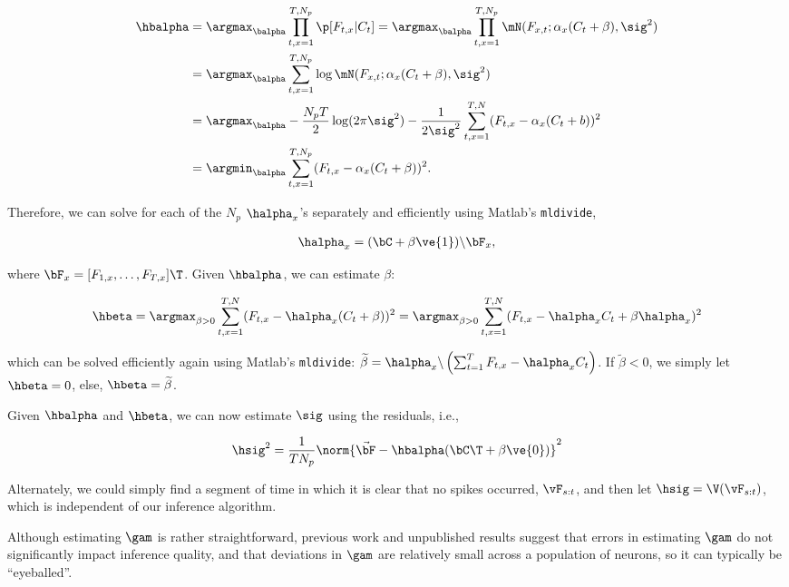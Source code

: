 \begin{subequations}
\begin{align}
\hbalpha 
&= \argmax_{\balpha} \prod_{t,x=1}^{T,N_p}  \p[F_{t,x} | C_t] 
=  \argmax_{\balpha} \prod_{t,x=1}^{T,N_p} \mN(F_{x,t}; \alpha_x ( C_t + \beta), \sig^2) \\
&= \argmax_{\balpha} \sum_{t,x=1}^{T,N_p} \log \mN (F_{x,t}; \alpha_x ( C_t + \beta), \sig^2)  \\
&= \argmax_{\balpha}  -\frac{N_p T}{2}\log(2\pi \sig^2) -\frac{1}{2\sig^2}\sum_{t,x=1}^{T,N} (F_{t,x} - \alpha_x(C_t + b))^2 \\
&= \argmin_{\balpha} \sum_{t,x=1}^{T,N_p} (F_{t,x} - \alpha_x(C_t + \beta))^2.
\end{align}
\end{subequations}

Therefore, we can solve for each of the $N_p$ $\halpha_x$'s separately and efficiently using Matlab's  \texttt{mldivide}, 

\begin{align}
	\halpha_x = (\bC + \beta\ve{1})\backslash \bF_x,
\end{align}

where $\bF_x=[F_{1,x}, \ldots, F_{T,x}]\T$. Given $\hbalpha$, we can estimate $\beta$:

\begin{align}
\hbeta 
= \argmax_{\beta>0} \sum_{t,x=1}^{T,N} (F_{t,x} - \halpha_x(C_t + \beta))^2 
= \argmax_{\beta>0} \sum_{t,x=1}^{T,N} (F_{t,x} - \halpha_x C_t + \beta \halpha_x)^2 
\end{align}

\noindent which can be solved efficiently again using Matlab's \texttt{mldivide}: $\widetilde{\beta}= \halpha_x \backslash \left(\sum_{t=1}^T F_{t,x} - \halpha_x C_t\right)$.  If $\widetilde{\beta}<0$, we simply let $\hbeta=0$, else, $\hbeta=\widetilde{\beta}$.

Given $\hbalpha$ and $\hbeta$, we can now estimate $\sig$ using the residuals, i.e.,

\begin{align}
	\hsig^2 = \frac{1}{T N_p}\norm{\vec{\bF} - \hbalpha(\bC\T + \beta \ve{0})}^2
\end{align}

Alternately, we could simply find a segment of time in which it is clear that no spikes occurred, $\vF_{s:t}$, and then let $\hsig=\V(\vF_{s:t})$, which is independent of our inference algorithm. 

Although estimating $\gam$ is rather straightforward, previous work \cite{YaksiFriedrich07} and unpublished results suggest that errors in estimating $\gam$ do not significantly impact inference quality, and that deviations in $\gam$ are relatively small across a population of neurons, so it can typically be ``eyeballed''.  

